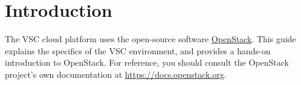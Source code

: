 \chapter*{Introduction}
The VSC cloud platform uses the open-source software
\href{https://openstack.org}{\gls{OpenStack}}.  This guide explains
the specifics of the VSC environment, and provides a hands-on
introduction to OpenStack.  For reference, you should consult the
OpenStack project's own documentation at
\url{https://docs.openstack.org}.

